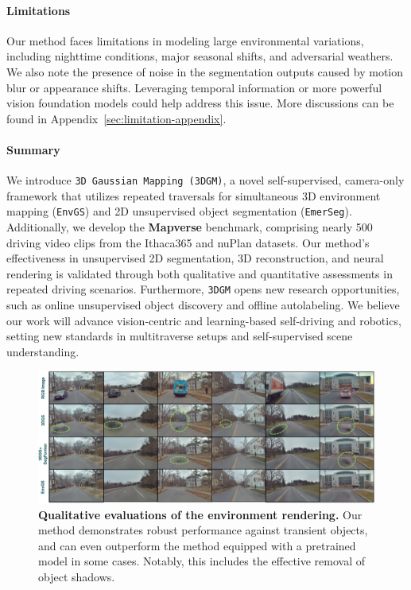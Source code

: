 \paragraph{Limitations}
Our method faces limitations in modeling large environmental variations, including nighttime conditions, major seasonal shifts, and adversarial weathers. We also note the presence of noise in the segmentation outputs caused by motion blur or appearance shifts. Leveraging temporal information or more powerful vision foundation models could help address this issue. More discussions can be found in Appendix~\ref{sec:limitation-appendix}.

\paragraph{Summary} We introduce \texttt{3D Gaussian Mapping (3DGM)}, a novel self-supervised, camera-only framework that utilizes repeated traversals for simultaneous 3D environment mapping (\texttt{EnvGS}) and 2D unsupervised object segmentation (\texttt{EmerSeg}). Additionally, we develop the \textbf{Mapverse} benchmark, comprising nearly 500 driving video clips from the Ithaca365 and nuPlan datasets. Our method's effectiveness in unsupervised 2D segmentation, 3D reconstruction, and neural rendering is validated through both qualitative and quantitative assessments in repeated driving scenarios. Furthermore, \texttt{3DGM} opens new research opportunities, such as online unsupervised object discovery and offline autolabeling. We believe our work will advance vision-centric and learning-based self-driving and robotics, setting new standards in multitraverse setups and self-supervised scene understanding.

\begin{figure}[t]
\begin{center}
\centerline{\includegraphics[width=\columnwidth]{figs_compressed/envrendering_compressed.pdf}}
\caption{\textbf{Qualitative evaluations of the environment rendering.} Our method demonstrates robust performance against transient objects, and can even outperform the method equipped with a pretrained model in some cases. Notably, this includes the effective removal of object shadows.}
\label{fig:visenv}
\end{center}
\vspace{-5mm}
\end{figure}

